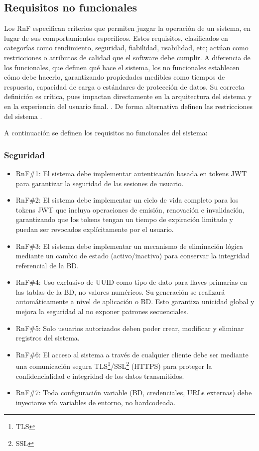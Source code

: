 \subsection{Requisitos no funcionales}

Los \ac{RnF} especifican criterios que permiten juzgar la operación de un sistema, en lugar 
de sus comportamientos específicos. Estos requisitos, clasificados en categorías como rendimiento, 
seguridad, fiabilidad, usabilidad, etc; actúan como restricciones o atributos de calidad que el software
debe cumplir. A diferencia de los funcionales, que definen qué hace el sistema, los no funcionales 
establecen cómo debe hacerlo, garantizando propiedades medibles como tiempos de respuesta, capacidad de
carga o estándares de protección de datos. Su correcta definición es crítica, pues impactan directamente en
la arquitectura del sistema y en la experiencia del usuario final. \citep{serna-montoya2012}. 
De forma alternativa definen las restricciones del sistema \citep{sommerville2005}.

A continuación se definen los requisitos no funcionales del sistema:

\subsubsection{Seguridad}

\begin{itemize}
	\item \ac{RnF}\#1: El sistema debe implementar autenticación basada en tokens \ac{JWT} para garantizar la seguridad de las sesiones de usuario.
	\item \ac{RnF}\#2: El sistema debe implementar un ciclo de vida completo para los tokens \ac{JWT} que incluya operaciones de emisión, 
			renovación e invalidación, garantizando que los tokens tengan un tiempo de expiración limitado y puedan ser 
			revocados explícitamente por el usuario.
	\item \ac{RnF}\#3: El sistema debe implementar un mecanismo de eliminación lógica mediante 
			un cambio de estado (activo/inactivo)  para conservar la integridad referencial de la 
			\ac{BD}. 
	\item \ac{RnF}\#4: Uso exclusivo de \ac{UUID} como tipo de dato para llaves primarias en las tablas de la \ac{BD}, no valores numéricos.
			Su generación se realizará automáticamente a nivel de aplicación o \ac{BD}. Esto garantiza unicidad global y mejora la seguridad al no exponer 
			patrones secuenciales.
	\item \ac{RnF}\#5: Solo usuarios autorizados deben poder crear, modificar y eliminar registros del sistema.
	\item \ac{RnF}\#6: El acceso al sistema a través de cualquier cliente debe ser mediante una
			comunicación segura TLS\footnote{\ac{TLS}}/SSL\footnote{\ac{SSL}} (\ac{HTTPS}) para proteger la 
			confidencialidad e integridad de los datos transmitidos.
	\item \ac{RnF}\#7: Toda configuración variable (\ac{BD}, credenciales, \ac{URL}s externas) debe inyectarse vía variables de entorno, no hardcodeada.
\end{itemize}

